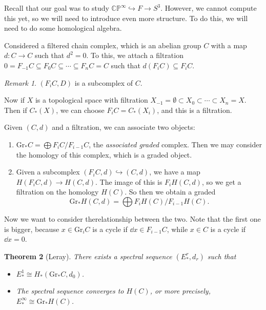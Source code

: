 \documentclass[leqno, openany]{memoir}
\newtheorem{thm}{Theorem}[section]
\theoremstyle{definition}
\theoremstyle{remark}
\newtheorem{rmk}[thm]{Remark}
\theoremstyle{plain}
\theoremstyle{definition}
\theoremstyle{remark}
\newcommand{\C}{\mathbb{C}}
\renewcommand{\P}{\mathbb{P}}
\newcommand{\mr}[1]{\mathrm{#1}}
\begin{document}
Recall that our goal was to study $\C\P^{\infty} \hookrightarrow F \to S^3$.
However, we cannot compute this yet, so we will need to introduce even more
structure. To do this, we will need to do some homological algebra.

Considered a filtered chain complex, which is an abelian group $C$ with a map
$d \colon C \to C$ such that $d^2 = 0$. To this, we attach a filtration $0 =
F_{-1} C \subseteq F_0 C \subseteq \cdots \subseteq F_n C = C$ such that $d(F_i
C) \subseteq F_i C$.

\begin{rmk} $(F_i C, D)$ is a subcomplex of $C$.  \end{rmk}

Now if $X$ is a topological space with filtration $X_{-1} = \emptyset \subset
X_0 \subset \cdots \subset X_n = X$. Then if $C_*(X)$, we can choose $F_i C =
C_*(X_i)$, and this is a filtration.

Given $(C,d)$ and a filtration, we can associate two objects: \begin{enumerate}
    \item $\mr{Gr}_* C = \bigoplus F_i C / F_{i-1} C$, the \textit{associated
        graded} complex. Then we may consider the homology of this complex,
        which is a graded object.  \item Given a subcomplex $(F_i C, d)
        \hookrightarrow (C,d)$, we have a map $H(F_i C, d) \to H(C, d)$. The
        image of this is $F_i H(C,d)$, so we get a filtration on the homology
        $H(C)$. So then we obtain a graded \[ \mr{Gr}_* H(C,d) = \bigoplus F_i
    H(C) / F_{i-1} H(C). \] \end{enumerate} Now we want to consider
    therelationship between the two. Note that the first one is bigger, because
    $x \in \mr{Gr}_i C$ is a cycle if $\dd{x} \in F_{i-1} C$, while $x \in C$
    is a cycle if $\dd{x} = 0$.

\begin{thm}[Leray] There exists a spectral sequence $(E_*^r, d_r)$ such that
    \begin{itemize} \item $E_*^1 \cong H_* (\mr{Gr}_* C, d_0)$.  \item The
        spectral sequence converges to $H(C)$, or more precisely, $E_*^{\infty}
        \cong \mr{Gr}_* H(C)$.  \end{itemize} \end{thm}
\end{document}
